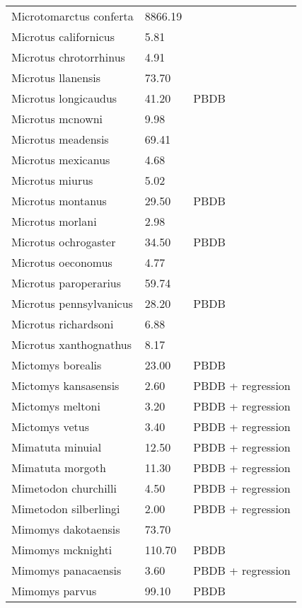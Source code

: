 \begin{longtable}{p{} p{} p{}}
    Microtomarctus conferta & 8866.19 & \cite{Tomiya2013} \\ 
    Microtus californicus & 5.81 & \cite{Smith2004} \\ 
    Microtus chrotorrhinus & 4.91 & \cite{Smith2004} \\ 
    Microtus llanensis & 73.70 & \cite{Tomiya2013} \\ 
    Microtus longicaudus & 41.20 & PBDB \\ 
    Microtus mcnowni & 9.98 & \cite{Smith2004} \\ 
    Microtus meadensis & 69.41 & \cite{Tomiya2013} \\ 
    Microtus mexicanus & 4.68 & \cite{Smith2004} \\ 
    Microtus miurus & 5.02 & \cite{Smith2004} \\ 
    Microtus montanus & 29.50 & PBDB \\ 
    Microtus morlani & 2.98 & \cite{Ivy1990} \\ 
    Microtus ochrogaster & 34.50 & PBDB \\ 
    Microtus oeconomus & 4.77 & \cite{Smith2004} \\ 
    Microtus paroperarius & 59.74 & \cite{Tomiya2013} \\ 
    Microtus pennsylvanicus & 28.20 & PBDB \\ 
    Microtus richardsoni & 6.88 & \cite{Smith2004} \\ 
    Microtus xanthognathus & 8.17 & \cite{Smith2004} \\ 
    Mictomys borealis & 23.00 & PBDB \\ 
    Mictomys kansasensis & 2.60 & PBDB + regression \\ 
    Mictomys meltoni & 3.20 & PBDB + regression \\ 
    Mictomys vetus & 3.40 & PBDB + regression \\ 
    Mimatuta minuial & 12.50 & PBDB + regression \\ 
    Mimatuta morgoth & 11.30 & PBDB + regression \\ 
    Mimetodon churchilli & 4.50 & PBDB + regression \\ 
    Mimetodon silberlingi & 2.00 & PBDB + regression \\ 
    Mimomys dakotaensis & 73.70 & \cite{Tomiya2013} \\ 
    Mimomys mcknighti & 110.70 & PBDB \\ 
    Mimomys panacaensis & 3.60 & PBDB + regression \\ 
    Mimomys parvus & 99.10 & PBDB \\ 

\end{longtable}
